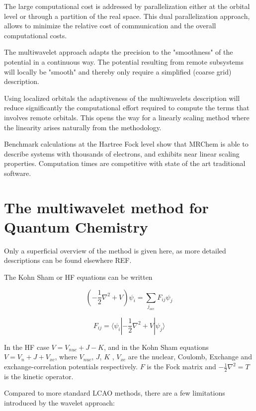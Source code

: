 \documentclass{article}
\begin{document}
The large computational cost is addressed by parallelization either at the orbital level or through a partition of the real space. This  dual parallelization approach, allows to minimize the relative cost of communication and the overall computational costs.

The multiwavelet approach adapts the precision to the "smoothness" of the potential in a continuous way. The potential resulting from remote subsystems will locally be "smooth" and thereby only require a simplified (coarse grid) description. 

Using localized orbitals the adaptiveness of the multiwavelets description will reduce significantly the computational effort required to compute the terms that involves remote orbitals. This opens the way for a linearly scaling method where the linearity arises naturally from the methodology.


Benchmark calculations at the Hartree Fock level show that MRChem is able to describe systems with thousands of electrons, and exhibits near linear scaling properties. Computation times are competitive with state of the art traditional software.


\section{The multiwavelet method for Quantum Chemistry}

Only a superficial overview of the method is given here, as more detailed descriptions can be found elsewhere REF.

The Kohn Sham or HF equations can be written

\begin{equation}
  (-\frac{1}{2}\nabla^2 + V) \psi_i = \sum_{j_{occ}} F_{ij} \psi_j
\end{equation}

\begin{equation}
  F_{ij} = \langle \psi_i |{-\frac{1}{2}\nabla^2+V}| {\psi_j}\rangle
\end{equation}

In the HF case $V=V_{nuc}+J-K$, and in the Kohn Sham equations $V=V_n+J+V_{xc}$, where $V_{nuc}$, $J$, $K$ , $V_{xc}$ are the nuclear, Coulomb, Exchange and exchange-correlation potentials respectively. $F$ is the Fock matrix and $-\frac{1}{2}\nabla^2 = T$ is the kinetic operator.

Compared to more standard LCAO methods, there are a few limitations introduced by the wavelet approach:
\end{document}

